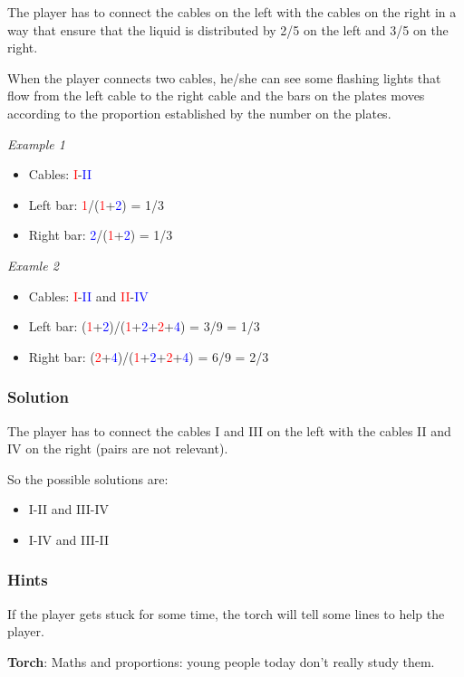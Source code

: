 The player has to connect the cables on the left with the cables on the right in a way that ensure that the liquid is distributed by 2/5 on the left and 3/5 on the right.

When the player connects two cables, he/she can see some flashing lights that flow from the left cable to the right cable and the bars on the plates moves according to the proportion established by the number on the plates.

\textit{Example 1}
\begin{itemize}
	\item Cables: \textcolor{red}{I}-\textcolor{blue}{II}
	\item Left bar: \textcolor{red}{1}/(\textcolor{red}{1}+\textcolor{blue}{2}) = 1/3
	\item Right bar: \textcolor{blue}{2}/(\textcolor{red}{1}+\textcolor{blue}{2}) = 1/3
\end{itemize}

\textit{Examle 2}
\begin{itemize}
	\item Cables: \textcolor{red}{I}-\textcolor{blue}{II} and \textcolor{red}{II}-\textcolor{blue}{IV}
	\item Left bar: (\textcolor{red}{1}+\textcolor{blue}{2})/(\textcolor{red}{1}+\textcolor{blue}{2}+\textcolor{red}{2}+\textcolor{blue}{4}) = 3/9 = 1/3
	\item Right bar: (\textcolor{red}{2}+\textcolor{blue}{4})/(\textcolor{red}{1}+\textcolor{blue}{2}+\textcolor{red}{2}+\textcolor{blue}{4}) = 6/9 = 2/3
\end{itemize}

\subsubsection*{Solution}
The player has to connect the cables I and III on the left with the cables II and IV on the right (pairs are not relevant).

So the possible solutions are:
\begin{itemize}
	\item I-II and III-IV
	\item I-IV and III-II
\end{itemize}

\subsubsection*{Hints}
If the player gets stuck for some time, the torch will tell some lines to help the player.

\textbf{Torch}: Maths and proportions: young people today don't really study them.
